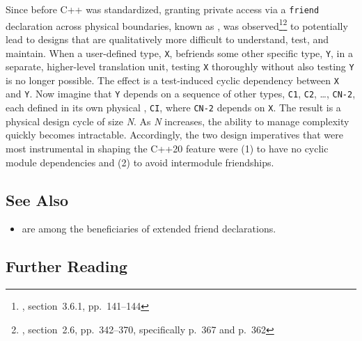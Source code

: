 Since before C++ was standardized, granting private access via a
\lstinline!friend! declaration across physical boundaries, known as
, was
observed\footnote{\cite{lakos96}, section~3.6.1, pp.~141--144}\footnote{\cite{lakos20}, section~2.6, pp.~342--370, specifically p.~367 and p.~362} to potentially lead
to designs that are qualitatively more difficult to understand, test,
and maintain. When a user-defined type, \lstinline!X!, befriends some other
specific type, \lstinline!Y!, in a separate, higher-level translation unit,
testing \lstinline!X! thoroughly without also testing \lstinline!Y! is no
longer possible. The effect is a test-induced cyclic dependency between
\lstinline!X! and \lstinline!Y!. Now imagine that \lstinline!Y! depends on a
sequence of other types, \lstinline!C1!, \lstinline!C2!, \ldots,
\lstinline!CN-2!, each defined in its own physical ,
\lstinline!CI!, where \lstinline!CN-2! depends on \lstinline!X!. The result is a
physical design cycle of size \emph{N}. As \emph{N} increases, the
ability to manage complexity quickly becomes intractable. Accordingly,
the two design imperatives that were most instrumental in shaping the
C++20  feature were (1) to have no cyclic module
dependencies and (2) to avoid intermodule friendships.

\subsection[See Also]{See Also}\label{see-also}

\begin{itemize}
\item{are among the beneficiaries of extended friend declarations.}
\end{itemize}

\subsection[Further Reading]{Further Reading}\label{further-reading}


